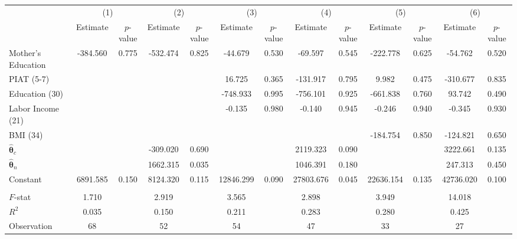 \begin{tabular}{lcccccccccccc} \toprule
 & \multicolumn{2}{c}{(1)}  &  \multicolumn{2}{c}{(2)}  &  \multicolumn{2}{c}{(3)}  &  \multicolumn{2}{c}{(4)}  & \multicolumn{2}{c}{(5)} & \multicolumn{2}{c}{(6)} \\  
 & Estimate & $p$-value & Estimate & $p$-value & Estimate & $p$-value & Estimate & $p$-value & Estimate & $p$-value & Estimate & $p$-value \\ \midrule
Mother's Education &  -384.560 &     0.775 &  -532.474 &     0.825 &   -44.679 &     0.530 &   -69.597 &     0.545 &  -222.778 &     0.625 &   -54.762 &     0.520 \\  
PIAT (5-7) &         &         &         &         &    16.725 &     0.365 &  -131.917 &     0.795 &     9.982 &     0.475 &  -310.677 &     0.835 \\  
Education (30) &         &         &         &         &  -748.933 &     0.995 &  -756.101 &     0.925 &  -661.838 &     0.760 &    93.742 &     0.490 \\  
Labor Income (21) &         &         &         &         &    -0.135 &     0.980 &    -0.140 &     0.945 &    -0.246 &     0.940 &    -0.345 &     0.930 \\  
BMI (34)  &         &         &         &         &         &         &         &         &  -184.754 &     0.850 &  -124.821 &     0.650 \\  
$\hat{\bm{\theta}}_c$&         &         &  -309.020 &     0.690 &         &         &  2119.323 &     0.090 &         &         &  3222.661 &     0.135 \\  
$\hat{\bm{\theta}}_n$ &         &         &  1662.315 &     0.035 &         &         &  1046.391 &     0.180 &         &         &   247.313 &     0.450 \\  
Constant &  6891.585 &     0.150 &  8124.320 &     0.115 & 12846.299 &     0.090 & 27803.676 &     0.045 & 22636.154 &     0.135 & 42736.020 &     0.100 \\ \\ \midrule 
$F$-stat &     1.710 &      &     2.919 &      &     3.565 &    &     2.898 &      &     3.949 &      &    14.018 &      \\  
$R^2$ &     0.035 &     &     0.150 &     &     0.211 &     &     0.283 &     &     0.280 &      &     0.425 &      \\  
Observation &    68 &      &    52 &     &    54 &     &    47 &     &    33 &      &    27 &      \\  
\bottomrule \end{tabular}
